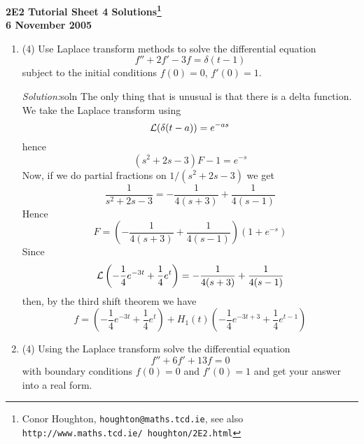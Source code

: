 \documentclass[12pt]{article}
\newcommand{\soln}{\noindent\textit{Solution:}}
\begin{document}
\begin{center}

{\bf 2E2 Tutorial Sheet 4 Solutions\footnote{Conor Houghton, {\tt houghton@maths.tcd.ie}, see also {\tt http://www.maths.tcd.ie/ houghton/2E2.html}}\\[1cm] 6 November 2005}
\end{center}


\begin{enumerate}

\item (4) Use Laplace transform methods to solve the differential equation
\begin{equation}
f'' + 2 f' - 3 f = \delta(t-1)
\end{equation}
subject to the initial conditions $f(0) = 0$, $f'(0) = 1$. 

\soln soln The only thing that is unusual is that there is a delta function. We take the Laplace transform using
\begin{equation}
{\cal L}(\delta(t-a))=e^{-as}
\end{equation}
hence
\begin{equation}
(s^2+2s-3)F-1=e^{-s}
\end{equation}
Now, if we do partial fractions on $1/(s^2+2s-3)$ we get
\begin{equation}
\frac{1}{s^2+2s-3}=-\frac{1}{4(s+3)}+\frac{1}{4(s-1)}
\end{equation}
Hence
\begin{equation}
F=\left(-\frac{1}{4(s+3)}+\frac{1}{4(s-1)}\right)\left(1+e^{-s}\right)
\end{equation}
Since 
\begin{equation}
{\cal L}\left(-\frac{1}{4}e^{-3t}+\frac{1}{4}e^t\right)=-\frac{1}{4(s+3)}+\frac{1}{4(s-1)}
\end{equation}
then, by the third shift theorem we have
\begin{equation}
f=\left(-\frac{1}{4}e^{-3t}+\frac{1}{4}e^{t}\right)+H_1(t)\left(-\frac{1}{4}e^{-3t+3}+\frac{1}{4}e^{t-1}\right)
\end{equation}

\item (4)
Using the Laplace transform solve the differential equation
\begin{equation}
f''+6f'+13f=0
\end{equation}
with boundary conditions $f(0)=0$ and $f'(0)=1$ and get your answer into a real form. 


\end{enumerate}
\end{document}
